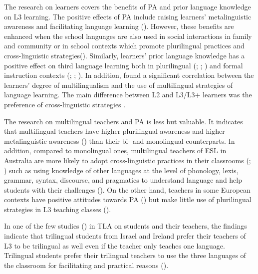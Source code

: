 \documentclass[output=paper]{../langscibook}
\begin{document}
The research on learners covers the benefits of PA and prior language knowledge on L3 learning. The positive effects of PA include raising learners’ metalinguistic awareness \citep{JessnerEtAl2016} and facilitating language learning (\citealt{BonoStratilaki2009}). However, these benefits are enhanced when the school languages are also used in social interactions in family and community or in school contexts which promote plurilingual practices and cross-linguistic strategies\linebreak (\citealt{BonoStratilaki2009}). Similarly, learners’ prior language knowledge has a positive effect on third language learning both in plurilingual (\citealt{BonoStratilaki2009}; \citealt{Cenoz2013b}; \citealt{Sanchez2015}) and formal instruction contexts (\citealt{Kemp2001}; \citealt{GibsonHufeisen2003};  \citealt{DeAngelis2007}). In addition, \citet{Dmitrenko2017} found a significant correlation between the learners’ degree of multilingualism and the use of multilingual strategies of language learning. The main difference between L2 and L3/L3+ learners was the preference of cross-linguistic strategies \citep{Dmitrenko2017}.

The research on multilingual teachers and PA is less but valuable. It indicates that multilingual teachers have higher plurilingual awareness \citep{Otwinowska2014} and higher metalinguistic awareness (\citealt{Ellis2004,Ellis2013}) than their bi- and monolingual counterparts. In addition, compared to monolingual ones, multilingual teachers of ESL in Australia are more likely to adopt cross-linguistic practices in their classrooms (\citealt{Ellis2004,Ellis2013}; \citealt{HigginsPonte2017}) such as using knowledge of other languages at the level of phonology, lexis, grammar, syntax, discourse, and pragmatics to understand language and help students with their challenges (\citealt{Ellis2004,Ellis2013}). On the other hand, teachers in some European contexts have positive attitudes towards PA (\citealt{GrivaEtAl2016}) but make little use of plurilingual strategies in L3 teaching classes (\citealt{GöbelVieluf2014}).

In one of the few studies (\citealt{AroninOLaoire2003}) in TLA on students and their teachers, the findings indicate that trilingual students from Israel and Ireland prefer their teachers of L3 to be trilingual as well even if the teacher only teaches one language. Trilingual students prefer their trilingual teachers to use the three languages of the classroom for facilitating and practical reasons (\citealt{AroninOLaoire2003}).
\end{document}
